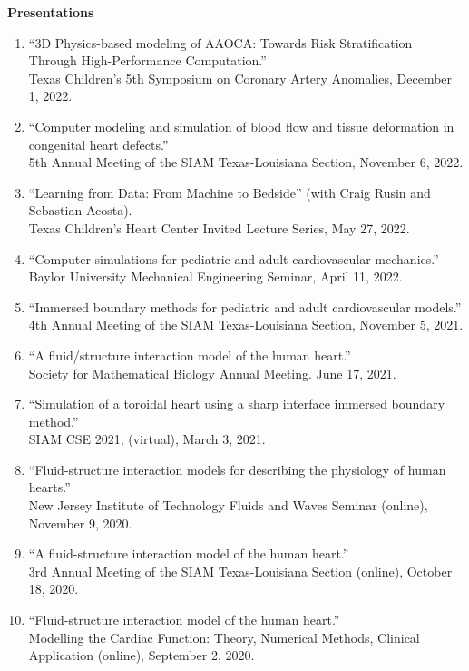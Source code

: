 \documentclass{article} %
\begin{document}
\vspace{0.5cm}
\noindent
{\bf \large Presentations}
\begin{enumerate}
\item ``3D Physics-based modeling of AAOCA: Towards Risk Stratification \\ Through High-Performance Computation.'' \\
Texas Children's 5th Symposium on Coronary Artery Anomalies, December 1, 2022.
\item ``Computer modeling and simulation of blood flow and tissue deformation in congenital heart defects.''\\
5th Annual Meeting of the SIAM Texas-Louisiana Section, November 6, 2022.
\item ``Learning from Data: From Machine to Bedside'' (with Craig Rusin and Sebastian Acosta). \\
Texas Children's Heart Center Invited Lecture Series, May 27, 2022.
\item ``Computer simulations for pediatric and adult cardiovascular mechanics.'' \\
Baylor University Mechanical Engineering Seminar, April 11, 2022.
\item ``Immersed boundary methods for pediatric and adult cardiovascular models.''\\
4th Annual Meeting of the SIAM Texas-Louisiana Section, November 5, 2021.
\item ``A fluid/structure interaction model of the human heart.'' \\
Society for Mathematical Biology Annual Meeting.  June 17, 2021.
\item ``Simulation of a toroidal heart using a sharp interface immersed boundary method.'' \\
SIAM CSE 2021, (virtual), March 3, 2021.
\item ``Fluid-structure interaction models for describing the physiology of human hearts.'' \\ New Jersey Institute of Technology Fluids and Waves Seminar (online), November 9, 2020.
\item ``A fluid-structure interaction model of the human heart.'' \\ 3rd Annual Meeting of the SIAM Texas-Louisiana Section (online), October 18, 2020.
\item ``Fluid-structure interaction model of the human heart.'' \\
Modelling the Cardiac Function: Theory, Numerical Methods, Clinical Application (online), September 2, 2020.

\end{enumerate}
\end{document}
